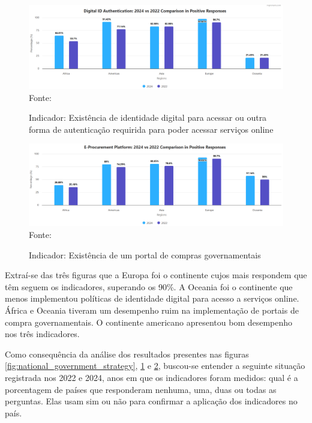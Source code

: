 \begin{figure}[H]
	\centering
	\caption{Indicador: Existência de identidade digital para acessar ou outra forma de autenticação requirida para poder acessar serviços online}
	\includegraphics[width=1\linewidth]{figuras/ict_in_government/digital_identity}
	\label{fig:national_identity}
	\footnotesize{Fonte: \cite{ONU_ICT_in_government_indicators}}
\end{figure}

\begin{figure}[H]
	\centering
	\caption{Indicador: Existência de um portal de compras governamentais}
	\includegraphics[width=1\linewidth]{figuras/ict_in_government/procurement_portal}
	\label{fig:procurement_portal}
	\footnotesize{Fonte: \cite{ONU_ICT_in_government_indicators}}
\end{figure}

Extraí-se das três figuras que a Europa foi o continente cujos mais respondem que têm seguem os indicadores, superando os 90\%. A Oceania foi o continente que menos implementou políticas de identidade digital para acesso a serviços online. África e Oceania tiveram um desempenho ruim na implementação de portais de compra governamentais. O continente americano apresentou bom desempenho nos três indicadores.

Como consequência da análise dos resultados presentes nas figuras \ref{fig:national_government_strategy}, \ref{fig:national_identity} e \ref{fig:procurement_portal}, buscou-se entender a seguinte situação registrada nos 2022 e 2024, anos em que os indicadores foram medidos: qual é a porcentagem de países que responderam nenhuma, uma, duas ou todas as perguntas. Elas usam sim ou não para confirmar a aplicação dos indicadores no país.

